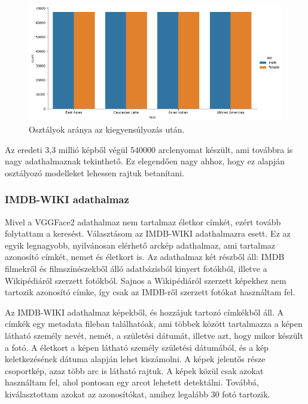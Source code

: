 \begin{figure}[ht]
	\centering
	\includegraphics[width=1\columnwidth]{figures/VGG_balanced.png}
	\caption{Osztályok aránya az kiegyensúlyozás után.}
	\label{fig:vgg_ba}
\end{figure}

Az eredeti 3,3 millió képből végül 540000 arclenyomat készült, ami továbbra is nagy adathalmaznak tekinthető. Ez elegendően nagy ahhoz, hogy ez alapján osztályozó modelleket lehessen rajtuk betanítani.

\subsubsection*{IMDB-WIKI adathalmaz}

Mivel a VGGFace2 adathalmaz nem tartalmaz életkor címkét, ezért tovább folytattam a keresést. Választásom az IMDB-WIKI \cite{imdbwiki2018} adathalmazra esett. Ez az egyik legnagyobb, nyilvánosan elérhető arckép adathalmaz, ami tartalmaz azonosító címkét, nemet és életkort is. Az adathalmaz két részből áll: IMDB filmekről és filmszínészekből álló adatbázisból kinyert fotókból, illetve a Wikipédiáról szerzett fotókból. Sajnos a Wikipédiáról szerzett képekhez nem tartozik azonosító címke, így csak az IMDB-ről szerzett fotókat használtam fel.

Az IMDB-WIKI adathalmaz képekből, és hozzájuk tartozó címkékből áll. A címkék egy metadata fileban találhatóak, ami többek között tartalmazza a képen látható személy nevét, nemét, a születési dátumát, illetve azt, hogy mikor készült a fotó. A életkort a képen látható személy születési dátumából, és a kép keletkezésének dátuma alapján lehet kiszámolni. A képek jelentős része csoportkép, azaz több arc is látható rajtuk. A képek közül csak azokat használtam fel, ahol pontosan egy arcot lehetett detektálni. Továbbá, kiválasztottam azokat az azonosítókat, amihez legalább 30 fotó tartozik.

